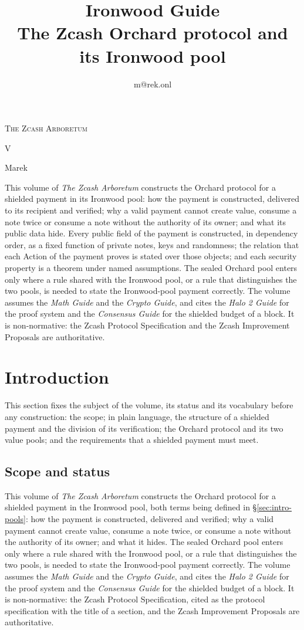 \documentclass[11pt,a4paper]{article}
\title{\textbf{\Huge Ironwood Guide}\\[6pt]\large The Zcash Orchard protocol and its Ironwood pool}
\author{m@rek.onl}
\date{}
\makeatletter
\theoremstyle{definition}
\let\arb@tableofcontents\tableofcontents
\renewcommand{\tableofcontents}{{\hypersetup{pdfborderstyle={/S/U/W 0}}%
  \arb@tableofcontents}}
\providecommand{\accession}{}
\def\arb@name#1#2\@nil{\def\arbvolname{#2}}
\def\arb@parsetitle\textbf#1\\[#2]#3#4\@nil{\arb@name#1\@nil\def\arb@sub{#4}}
\providecommand{\arbvolname}{}
\renewcommand{\maketitle}{\expandafter\arb@parsetitle\@title\@nil
  \hypersetup{pdftitle={\arbvolname: \arb@sub},pdfauthor={Marek}}%
  \thispagestyle{empty}\begingroup\raggedright
  {\fontsize{13.2}{16}\selectfont\scshape The Zcash Arboretum\par}
  \vspace*{50mm}
  {\fontsize{47.3}{50}\selectfont\accession\par}
  \vspace{6mm}
  {\fontsize{22.8}{27}\selectfont\arbvolname\par}
  \vspace{3mm}
  {\fontsize{13.2}{17}\selectfont\arb@sub\par}
  \vspace{18mm}
  {\fontsize{13.2}{17}\selectfont Marek\par}
  {\small\@author\par}
  \endgroup\clearpage}
\renewenvironment{abstract}{%
  \small\begin{center}{\bfseries\abstractname}\end{center}\medskip\noindent\ignorespaces
}{\par\medskip}
\renewcommand{\accession}{V}
\makeatother
\begin{document}
\maketitle

\begin{abstract}
This volume of \emph{The Zcash Arboretum} constructs the Orchard protocol for a
shielded payment in its Ironwood pool: how the payment is constructed, delivered
to its recipient and verified; why a valid payment cannot create value, consume
a note twice or consume a note without the authority of its owner; and what its
public data hide. Every public field of the payment is constructed, in
dependency order, as a fixed function of private notes, keys and randomness; the
relation that each Action of the payment proves is stated over those objects;
and each security property is a theorem under named assumptions. The sealed
Orchard pool enters only where a rule shared with the Ironwood pool, or a rule
that distinguishes the two pools, is needed to state the Ironwood-pool payment
correctly. The volume assumes the \emph{Math Guide} and the \emph{Crypto Guide},
and cites the \emph{Halo 2 Guide} for the proof system and the \emph{Consensus
Guide} for the shielded budget of a block. It is non-normative: the Zcash
Protocol Specification and the Zcash Improvement Proposals are authoritative.
\end{abstract}
\clearpage
\tableofcontents
\clearpage

\section{Introduction}\label{sec:intro}

This section fixes the subject of the volume, its status and its vocabulary
before any construction: the scope; in plain language, the structure of a
shielded payment and the division of its verification; the Orchard protocol
and its two value pools; and the requirements that a shielded payment must
meet.

\subsection{Scope and status}\label{sec:intro-scope}

This volume of \emph{The Zcash Arboretum} constructs the Orchard protocol for
a shielded payment in the Ironwood pool, both terms being defined in
\S\ref{sec:intro-pools}: how the payment is constructed, delivered and
verified; why a valid payment cannot create value, consume a note twice, or
consume a note without the authority of its owner; and what it hides. The
sealed Orchard pool enters only where a rule shared with the Ironwood pool,
or a rule that distinguishes the two pools, is needed to state the
Ironwood-pool payment correctly. The volume assumes the \emph{Math Guide} and
the \emph{Crypto Guide}, and cites the \emph{Halo 2 Guide} for the proof
system and the \emph{Consensus Guide} for the shielded budget of a block. It
is non-normative: the Zcash Protocol Specification, cited as the protocol
specification with the title of a section, and the Zcash Improvement
Proposals are authoritative.
\end{document}
